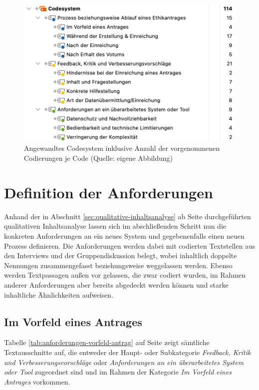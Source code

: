 \documentclass[a4paper,12pt,twoside]{scrreprt}
\begin{document}
\begin{figure}[ht]
    \centering
    \includegraphics[width=.8\linewidth]{thesis/images/Luidold_Codesystem-Anzahl.png}
    \caption[Angewandtes Codesystem inklusive Anzahl der vorgenommenen Codierungen je Code]{Angewandtes Codesystem inklusive Anzahl der vorgenommenen Codierungen je Code (Quelle: eigene Abbildung)}
    \label{fig:codesystem-anzahl}
\end{figure}

\section{Definition der Anforderungen}
\label{sec:definition-anforderungen}

Anhand der in Abschnitt \ref{sec:qualitative-inhaltsanalyse} ab Seite \pageref{sec:qualitative-inhaltsanalyse} durchgeführten qualitativen Inhaltsanalyse lassen sich im abschließenden Schritt nun die konkreten Anforderungen an ein neues System und gegebenenfalls einen neuen Prozess definieren. Die Anforderungen werden dabei mit codierten Textstellen aus den Interviews und der Gruppendiskussion belegt, wobei inhaltlich doppelte Nennungen zusammengefasst beziehungsweise weggelassen werden. Ebenso werden Textpassagen außen vor gelassen, die zwar codiert wurden, im Rahmen anderer Anforderungen aber bereits abgedeckt werden können und starke inhaltliche Ähnlichkeiten aufweisen.

\subsection{Im Vorfeld eines Antrages}
\label{sub-sec:vorfeld-antrag}

Tabelle \ref{tab:anforderungen-vorfeld-antrag} auf Seite \pageref{tab:anforderungen-vorfeld-antrag} zeigt sämtliche Textausschnitte auf, die entweder der Haupt- oder Subkategorie \textit{Feedback, Kritik und Verbesserungsvorschläge} oder \textit{Anforderungen an ein überarbeitetes System oder Tool} zugeordnet sind und im Rahmen der Kategorie \textit{Im Vorfeld eines Antrages} vorkommen.
\end{document}
